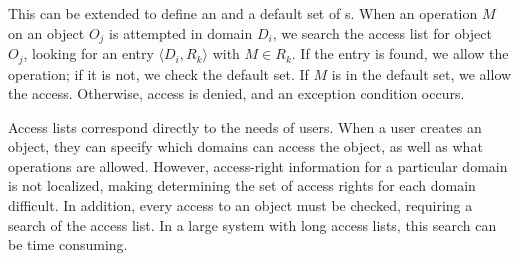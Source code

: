 This can be extended to define an  and a default set of s.
When an operation $M$ on an object $O_{j}$ is attempted in domain $D_{i}$, we search the access list for object $O_{j}$, looking for an entry $\langle D_{i}, R_{k} \rangle$ with $M \in R_{k}$.
If the entry is found, we allow the operation; if it is not, we check the default set.
If $M$ is in the default set, we allow the access.
Otherwise, access is denied, and an exception condition occurs.

Access lists correspond directly to the needs of users.
When a user creates an object, they can specify which domains can access the object, as well as what operations are allowed.
However, access-right information for a particular domain is not localized, making determining the set of access rights for each domain difficult.
In addition, every access to an object must be checked, requiring a search of the access list.
In a large system with long access lists, this search can be time consuming.


